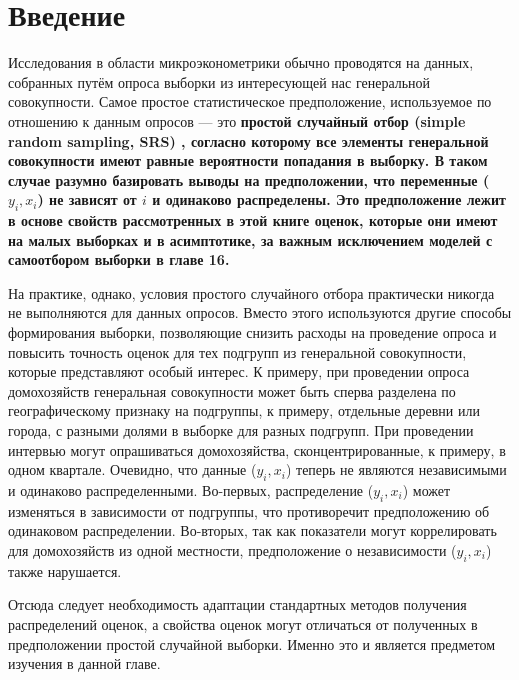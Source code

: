 \section{Введение}

Исследования в области микроэконометрики обычно проводятся на данных, собранных путём опроса выборки из интересующей нас генеральной совокупности. Самое простое статистическое предположение, используемое по отношению к данным опросов --- это \bfseries простой случайный отбор (simple random sampling, SRS) \mdseries, согласно которому все элементы генеральной совокупности имеют равные вероятности попадания в выборку. В таком случае разумно базировать выводы на предположении, что переменные ($y_i,x_i$) не зависят от $i$ и одинаково распределены. Это предположение лежит в основе свойств рассмотренных в этой книге оценок, которые они имеют на малых выборках и в асимптотике, за важным исключением моделей с самоотбором выборки в главе 16. 

На практике, однако, условия простого случайного отбора практически никогда не выполняются для данных опросов. Вместо этого используются другие способы формирования выборки, позволяющие снизить расходы на проведение опроса и повысить точность оценок для тех подгрупп из генеральной совокупности, которые представляют особый интерес. 
К примеру, при проведении опроса домохозяйств генеральная совокупности может быть сперва разделена по географическому признаку на подгруппы, к примеру, отдельные деревни или города, с разными долями в выборке для разных подгрупп. При проведении интервью могут опрашиваться домохозяйства, сконцентрированные, к примеру, в одном квартале. Очевидно, что данные  ($y_i,x_i$) теперь не являются независимыми и одинаково распределенными. Во-первых, распределение  ($y_i,x_i$) может изменяться в зависимости от подгруппы, что противоречит предположению об одинаковом распределении. Во-вторых, так как показатели могут коррелировать для домохозяйств из одной местности, предположение о независимости  ($y_i,x_i$) также нарушается. 

Отсюда следует необходимость адаптации стандартных методов получения распределений оценок, а свойства оценок могут отличаться от полученных в предположении простой случайной выборки. Именно это и является предметом изучения в данной главе. 

